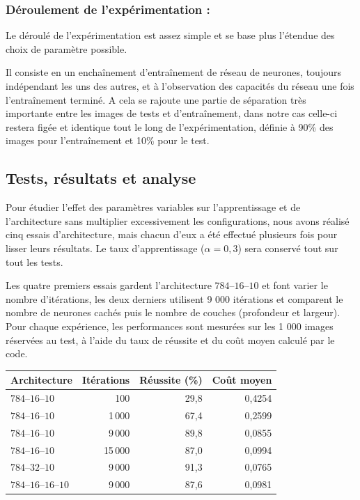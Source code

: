 \documentclass[12pt,a4paper]{article}
\begin{document}
\subsubsection{Déroulement de l'expérimentation :}

Le déroulé de l'expérimentation est assez simple et se base plus l'étendue des choix de paramètre possible.

Il consiste en un enchaînement d’entraînement de réseau de neurones, toujours indépendant les uns des autres, et à l'observation des capacités du réseau une fois l'entraînement terminé.
A cela se rajoute une partie de séparation très importante entre les images de tests et d'entraînement, dans notre cas celle-ci restera figée et identique tout le long de l'expérimentation, définie à 90\% des images pour l’entraînement et 10\% pour le test.

\subsection{Tests, résultats et analyse}

Pour étudier l’effet des paramètres variables sur l’apprentissage et de l’architecture sans multiplier excessivement les configurations, nous avons réalisé cinq essais d'architecture, mais chacun d'eux a été effectué plusieurs fois pour lisser leurs résultats. Le taux d’apprentissage ($\alpha=0{,}3$) sera conservé tout sur tout les tests.

Les quatre premiers essais gardent l’architecture $784$--$16$--$10$ et font varier le nombre d’itérations, les deux derniers utilisent 9 000 itérations et comparent le nombre de neurones cachés puis le nombre de couches (profondeur et largeur). Pour chaque expérience, les performances sont mesurées sur les 1 000 images réservées au test, à l’aide du taux de réussite et du coût moyen calculé par le code.

\begin{center}
\begin{tabular}{l|r|r|r}
\hline
\textbf{Architecture} & \textbf{Itérations} & \textbf{Réussite (\%)} & \textbf{Coût moyen} \\
\hline
$784$--$16$--$10$ & 100 & 29{,}8 & 0{,}4254 \\
$784$--$16$--$10$ & 1\,000 & 67{,}4 & 0{,}2599 \\
$784$--$16$--$10$ & 9\,000 & 89{,}8 & 0{,}0855 \\
$784$--$16$--$10$ & 15\,000 & 87{,}0 & 0{,}0994 \\
$784$--$32$--$10$ & 9\,000 & 91{,}3 & 0{,}0765 \\
$784$--$16$--$16$--$10$ & 9\,000 & 87{,}6 & 0{,}0981 \\
\hline
\end{tabular}
\end{center}
\end{document}
